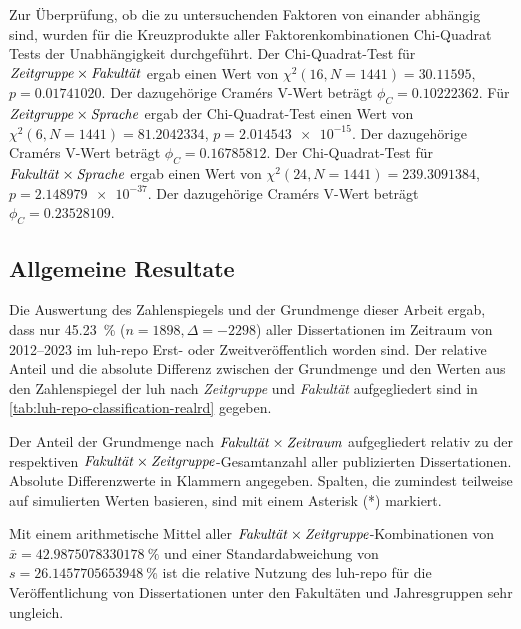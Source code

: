 Zur Überprüfung, ob die zu untersuchenden Faktoren von einander abhängig sind, wurden für die Kreuzprodukte aller Faktorenkombinationen Chi-Quadrat Tests der Unabhängigkeit durchgeführt.
Der Chi-Quadrat-Test für $\text{\textit{Zeitgruppe}}\times\text{\textit{Fakultät}}$ ergab einen Wert von $\chi^2 (\num{16}, N = \num{1441}) = \num[round-mode=places,round-precision=2]{30.11595}$, $p = \num[round-mode=places,round-precision=2]{0.01741020}$.
Der dazugehörige Cramérs V-Wert beträgt $\phi_C=\num[round-mode=places,round-precision=2]{0.10222362}$.
Für $\text{\textit{Zeitgruppe}}\times\text{\textit{Sprache}}$ ergab der Chi-Quadrat-Test einen Wert von $\chi^2 (\num{6}, N = \num{1441}) = \num[round-mode=places,round-precision=2]{81.2042334}$, $p = \num[round-mode=places,round-precision=2]{2.014543e-15}$.
Der dazugehörige Cramérs V-Wert beträgt $\phi_C=\num[round-mode=places,round-precision=2]{0.16785812}$.
Der Chi-Quadrat-Test für $\text{\textit{Fakultät}}\times\text{\textit{Sprache}}$ ergab einen Wert von $\chi^2 (\num{24}, N = \num{1441}) = \num[round-mode=places,round-precision=2]{239.3091384}$, $p = \num[round-mode=places,round-precision=2]{2.148979e-37}$.
Der dazugehörige Cramérs V-Wert beträgt $\phi_C=\num[round-mode=places,round-precision=2]{0.23528109}$.


\subsection{Allgemeine Resultate}\label{sec:luh-repo-results-general}
Die Auswertung des Zahlenspiegels und der Grundmenge dieser Arbeit ergab, dass nur \SI[round-mode=places,round-precision=2]{45,23}{\percent} ($n=\num{1898},\Delta=\num{-2298}$) aller Dissertationen im Zeitraum von 2012--2023 im \gls{luh-repo} Erst- oder Zweitveröffentlich worden sind.
Der relative Anteil und die absolute Differenz zwischen der Grundmenge und den Werten aus den Zahlenspiegel der \gls{luh} nach \textit{Zeitgruppe} und \textit{Fakultät} aufgegliedert sind in \cref{tab:luh-repo-classification-realrd} gegeben.
\begin{table}[!htbp]
	\caption{Der Anteil der Grundmenge nach $\text{\textit{Fakultät}}\times\text{\textit{Zeitraum}}$ aufgegliedert relativ zu der respektiven $\text{\textit{Fakultät}}\times\text{\textit{Zeitgruppe}}$-Gesamtanzahl aller publizierten Dissertationen.
    Absolute Differenzwerte in Klammern angegeben.
    Spalten, die zumindest teilweise auf simulierten Werten basieren, sind mit einem Asterisk (*) markiert.}
    
    \label{tab:luh-repo-zahlenspiegel-relative-grundmenge}
\end{table}
Mit einem arithmetische Mittel aller $\text{\textit{Fakultät}}\times\text{\textit{Zeitgruppe}}$-Kombinationen von $\bar{x}=\SI[round-mode=places,round-precision=2]{42.9875078330178}{\percent}$ und einer Standardabweichung von $s=\SI[round-mode=places,round-precision=2]{26.1457705653948}{\percent}$ ist die relative Nutzung des \gls{luh-repo} für die Veröffentlichung von Dissertationen unter den Fakultäten und Jahresgruppen sehr ungleich.

